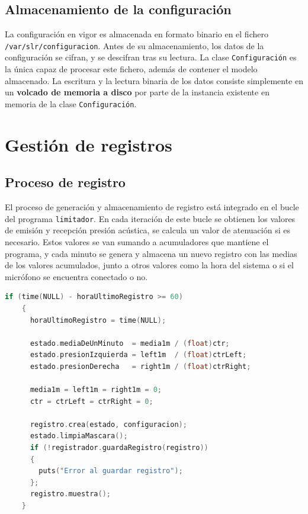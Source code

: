 \subsection{Almacenamiento de la configuración}

La configuración en vigor es almacenada en formato binario en el fichero \verb|/var/slr/configuracion|. Antes de su almacenamiento, los datos de la configuración se cifran, y se descifran tras su lectura. La clase \verb|Configuración| es la única capaz de procesar este fichero, además de contener el modelo almacenado. La escritura y la lectura binaria de los datos consiste simplemente en un \textbf{volcado de memoria a disco} por parte de la instancia existente en memoria de la clase \verb|Configuración|.


\section{Gestión de registros}

\subsection{Proceso de registro}

El proceso de generación y almacenamiento de registro está integrado en el bucle del programa \verb|limitador|. En cada iteración de este bucle se obtienen los valores de emisión y recepción presión acústica, se calcula un valor de atenuación si es necesario. Estos valores se van sumando a acumuladores que mantiene el programa, y cada minuto se genera y almacena un nuevo registro con las medias de los valores acumulados, junto a otros valores como la hora del sistema o si el micrófono se encuentra conectado o no. \\

\begin{lstlisting}[language=c++, label={lst:lms7-registrador}, caption={Generación de registros en el \acrshort{LM7}.}]
    if (time(NULL) - horaUltimoRegistro >= 60)
    {
      horaUltimoRegistro = time(NULL);

      estado.mediaDeUnMinuto  = media1m / (float)ctr;
      estado.presionIzquierda = left1m  / (float)ctrLeft;
      estado.presionDerecha   = right1m / (float)ctrRight;

      media1m = left1m = right1m = 0;
      ctr = ctrLeft = ctrRight = 0;

      registro.crea(estado, configuracion);
      estado.limpiaMascara();
      if (!registrador.guardaRegistro(registro))
      {
        puts("Error al guardar registro");
      };
      registro.muestra();
    }
\end{lstlisting}

